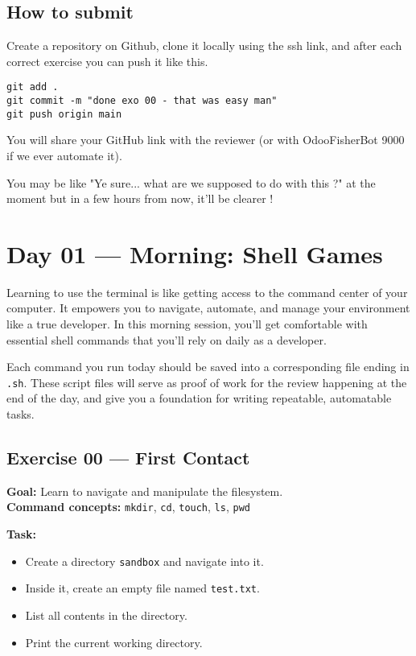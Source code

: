 \documentclass[12pt,a4paper]{article}
\begin{document}
\subsection*{How to submit}
Create a repository on Github, clone it locally using the ssh link, and after each correct exercise you can push it like this.
\begin{lstlisting}
git add .
git commit -m "done exo 00 - that was easy man"
git push origin main
\end{lstlisting}

\vspace{0.5em}
You will share your GitHub link with the reviewer (or with OdooFisherBot 9000 if we ever automate it).

You may be like "Ye sure... what are we supposed to do with this ?" at the moment but in a few hours from now, it'll be clearer !

\newpage

\section{Day 01 — Morning: Shell Games}

Learning to use the terminal is like getting access to the command center of your computer. It empowers you to navigate, automate, and manage your environment like a true developer. In this morning session, you'll get comfortable with essential shell commands that you'll rely on daily as a developer.

Each command you run today should be saved into a corresponding file ending in \texttt{.sh}. These script files will serve as proof of work for the review happening at the end of the day, and give you a foundation for writing repeatable, automatable tasks.

\newpage
\subsection*{Exercise 00 — First Contact}
\textbf{Goal:} Learn to navigate and manipulate the filesystem.\\
\textbf{Command concepts:} \texttt{mkdir}, \texttt{cd}, \texttt{touch}, \texttt{ls}, \texttt{pwd}

\textbf{Task:}
\begin{itemize}
  \item Create a directory \texttt{sandbox} and navigate into it.
  \item Inside it, create an empty file named \texttt{test.txt}.
  \item List all contents in the directory.
  \item Print the current working directory.
\end{itemize}
\end{document}
